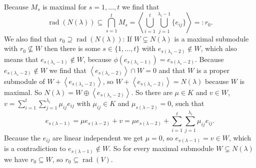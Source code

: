 \documentclass[a4paper,10pt]{article}
\theoremstyle{definition}
\newcommand{\rad}{\operatorname{rad}}
\newcommand{\gen}[1]{\left\langle#1\right\rangle}
\begin{document}
Because $M_s$ is maximal for $s = 1,\ldots,t$ we find that
\[
 \rad(N(\lambda))
 \subseteq \bigcap_{s=1}^t M_s
 = \gen{ \bigcup_{i=1}^t \bigcup_{j=1}^{\lambda_i-1} \{e_{ij}\} } =: r_0.
\]
We also find that $r_0 \supseteq \rad(N(\lambda))$: If $W \subsetneq N(\lambda)$ is a maximal submodule with $r_0 \nsubseteq W$ then there is some $s \in \{1,\ldots,t\}$ with $e_{s (\lambda_s-2)} \not\in W$, which also means that $e_{s (\lambda_s-1)} \not\in W$, because $\phi(e_{s (\lambda_s-1)}) = e_{s (\lambda_s-2)}$. Because $e_{s(\lambda_s-2)} \not \in W$ we find that $\gen{e_{s(\lambda_s-2)}} \cap W = 0$ and that $W$ is a proper submodule of $W + \gen{e_{s(\lambda_s-2)}}$, so $W + \gen{e_{s(\lambda_s-2)}} = N(\lambda)$ because $W$ is maximal. So $N(\lambda) = W \oplus \gen{e_{s(\lambda_s-2)}}$. So there are $\mu \in K$ and $v \in W$, $v = \sum_{i=1}^t \sum_{j=1}^{\lambda_i} \mu_{ij} e_{ij}$ with $\mu_{ij} \in K$ and $\mu_{s (\lambda-2)} = 0$, such that
\[
 e_{s (\lambda-1)} = \mu e_{s (\lambda-2)} + v = \mu e_{s (\lambda-2)} + \sum_{i=1}^t \sum_{j=1}^{\lambda_i} \mu_{ij} e_{ij}.
\]
Because the $e_{ij}$ are linear independent we get $\mu = 0$, so $e_{s (\lambda-1)} = v \in W$, which is a contradiction to $e_{s (\lambda-1)} \not \in W$. So for every maximal submodule $W \subsetneq N(\lambda)$ we have $r_0 \subseteq W$, so $r_0 \subseteq \rad(V)$.





\section{}
\end{document}
